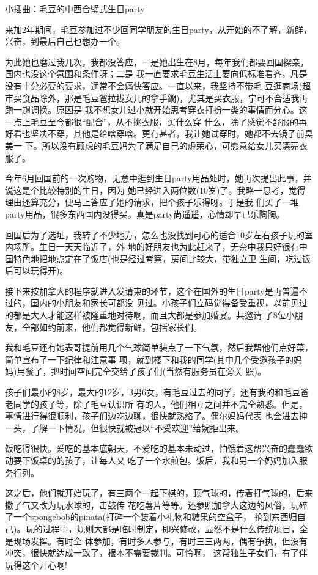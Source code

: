 \documentclass[11pt,a4paper,onecolumn]{article}
\begin{document}
小插曲：毛豆的中西合璧式生日party


来加2年期间，毛豆参加过不少回同学朋友的生日party，从开始的不了解，新鲜，兴奋，到最后自己也想办一个。

为此她也磨过我几次，我都没答应，一是她出生在8月，每年我们都要回国探亲，国内也没这个氛围和条件呀；二是
我一直要求毛豆生活上要向低标准看齐，凡是没有十分必要的要求，通常不会痛快答应。一直以来，我坚持不带毛
豆逛商场(超市买食品除外，那是毛豆爸拉拢女儿的拿手鐗)，尤其是买衣服，宁可不合适我再跑一趟调换。原因是
我不想女儿过小就开始思考穿衣打扮一类的事情而分心。这一点上毛豆至今都很``配合''，从不挑衣服，买什么穿
什么，除了感觉不舒服的再好看也坚决不穿，其他是给啥穿啥。更有甚者，我让她试穿时，她都不去镜子前臭美一
下。所以没有顾虑的毛豆妈为了满足自己的虚荣心，可愿意给女儿买漂亮衣服了。

今年6月回国前的一次购物，无意中逛到生日party用品处时，她再次提出此事，并说这是个比较特别的生日，因为
她已经进入两位数(10岁)了。我略一思考，觉得理由还算充分，便马上答应了她的请求，把个孩子乐得呀。于是我
们买了一堆party用品，很多东西国内没得买。真是party尚遥遥，心情却早已乐陶陶。

回国后为了选址，我转了不少地方，怎么也没找到可心的适合10岁左右孩子玩的室内场所。生日一天天临近了，外
地的好朋友也为此赶来了，无奈中我只好很有中国特色地把地点定在了饭店(也是经过考察，房间比较大，带独立卫
生间，吃过饭后可以玩得开)。

接下来按加拿大的程序就进入发请柬的环节，这个在国外的生日party是再普遍不过的，国内的小朋友和家长可都没
见过。小孩子们立码觉得备受重视，以前见过的都是大人才能这样被隆重地对待啊，而且大都是参加婚宴。共邀请
了8位小朋友，全部如约前来，他们都觉得新鲜，包括家长们。

我和毛豆还有她表哥提前用几个气球简单装点了一下气氛，然后我帮他们点好菜，简单宣布了一下纪律和注意事
项，就到楼下和我的同学(其中几个受邀孩子的妈妈)用餐了，把时间空间完全交给了孩子们(当然有服务员在旁关
照)。

孩子们最小的8岁，最大的12岁，3男6女，有毛豆过去的同学，还有我的和毛豆爸老同学的孩子等，除了毛豆认识所
有的人，他们相互之间并不完全熟悉。但是，事情进行得很顺利，孩子们边吃边聊，很快就熟络了。偶尔妈妈代表
也会进去抻一头，了解一下情况，但很快就被冠以``不受欢迎''给婉拒出来。

饭吃得很快。爱吃的基本底朝天，不爱吃的基本未动过，怕饿着这帮兴奋的蠢蠢欲动要下饭桌的的孩子，让每人又
吃了一个水煎包。饭后，我和另一个妈妈加入服务行列。

这之后，他们就开始玩了，有三两个一起下棋的，顶气球的，传着打气球的，后来撒了气又改为玩水球的，击鼓传
花吃薯片等等。还参照加拿大这边的风俗，玩碎了一个spongebob的pinata(打碎一个装着小礼物和糖果的空盒子，
抢到东西归自己)。玩的过程中，规则大都是临时制定，即兴修改，显然不是什么传统项目，全是现场发挥。有时全
体参加，有时多人参与，有时三三两两，偶有争执，但没有冲突，很快就达成一致了，根本不需要裁判。可怜啊，
这帮独生子女们，有了伴玩得这个开心啊!
\end{document}

